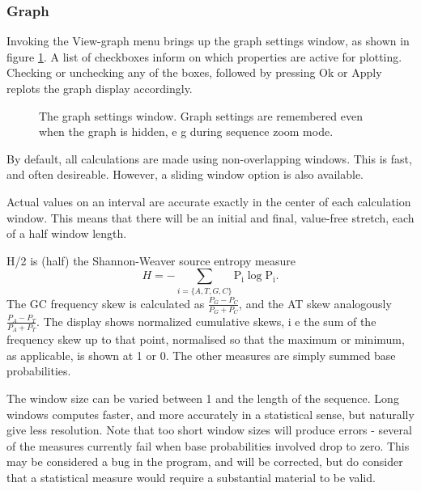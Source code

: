\subsubsection{Graph}

Invoking the View-graph menu brings up the graph settings window, as
shown in figure \ref{fig:GUIgraphset}. A list of checkboxes inform on
which properties are active for plotting. Checking or unchecking any
of the boxes, followed by pressing Ok or Apply replots the graph
display accordingly.

\begin{figure}[htbp]
	\begin{center}
	\end{center}
\caption{The graph settings window. Graph settings are remembered even when the graph is hidden, e g during sequence zoom mode.}
\label{fig:GUIgraphset}
\end{figure}

By default, all calculations are made using non-overlapping
windows. This is fast, and often desireable. However, a sliding window
option is also available.

Actual values on an interval are accurate exactly in the center of
each calculation window. This means that there will be an initial and
final, value-free stretch, each of a half window length.

H/2 is (half) the Shannon-Weaver source entropy measure 
\begin{displaymath}
H=-\sum_{i = \{A,T,G,C\}} \mathrm{P_i}\log\mathrm{P_i}.
\end{displaymath}
The GC frequency skew is calculated as $\frac{P_G-P_C}{P_G+P_C}$, and the AT skew analogously
$\frac{P_A-P_T}{P_A+P_T}$. The display shows normalized cumulative skews, i e the sum of the frequency skew
up to that point, normalised so that the maximum or minimum, as applicable, is shown at 1 or 0.
The other measures are simply summed base probabilities.

The window size can be varied between 1 and the length of the
sequence. Long windows computes faster, and more accurately in a
statistical sense, but naturally give less resolution.  Note that too
short window sizes will produce errors - several of the measures
currently fail when base probabilities involved drop to zero. This may
be considered a bug in the program, and will be corrected, but do
consider that a statistical measure would require a substantial
material to be valid.

